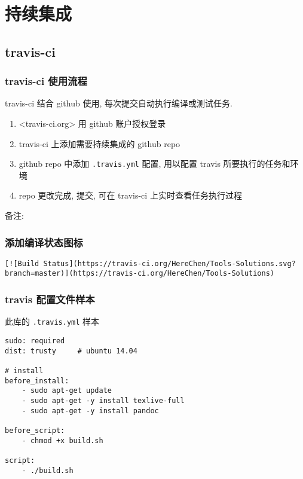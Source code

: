 \section{持续集成}\label{ux6301ux7eedux96c6ux6210}

\subsection{travis-ci}\label{travis-ci}

\subsubsection{travis-ci
使用流程}\label{travis-ci-ux4f7fux7528ux6d41ux7a0b}

travis-ci 结合 github 使用, 每次提交自动执行编译或测试任务.

\begin{enumerate}
\def\labelenumi{\arabic{enumi}.}
\tightlist
\item
  \textless{}travis-ci.org\textgreater{} 用 github 账户授权登录
\item
  travis-ci 上添加需要持续集成的 github repo
\item
  github repo 中添加 \lstinline!.travis.yml! 配置, 用以配置 travis
  所要执行的任务和环境
\item
  repo 更改完成, 提交, 可在 travis-ci 上实时查看任务执行过程
\end{enumerate}

备注:

\subsubsection{添加编译状态图标}\label{ux6dfbux52a0ux7f16ux8bd1ux72b6ux6001ux56feux6807}

\begin{lstlisting}
[![Build Status](https://travis-ci.org/HereChen/Tools-Solutions.svg?branch=master)](https://travis-ci.org/HereChen/Tools-Solutions)
\end{lstlisting}

\subsubsection{travis
配置文件样本}\label{travis-ux914dux7f6eux6587ux4ef6ux6837ux672c}

此库的 \lstinline!.travis.yml! 样本

\begin{lstlisting}
sudo: required
dist: trusty     # ubuntu 14.04

# install
before_install:
    - sudo apt-get update
    - sudo apt-get -y install texlive-full
    - sudo apt-get -y install pandoc

before_script:
    - chmod +x build.sh

script:
    - ./build.sh
\end{lstlisting}


